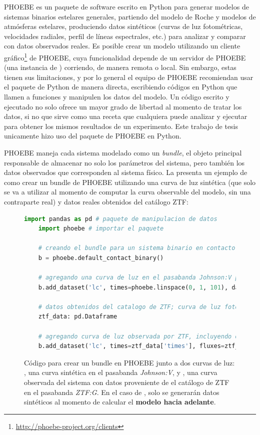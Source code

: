 PHOEBE es un paquete de software escrito en Python para generar modelos de
sistemas binarios estelares generales, partiendo del modelo de Roche y modelos
de atmósferas estelares, produciendo datos sintéticos (curvas de luz
fotométricas, velocidades radiales, perfil de líneas espectrales, etc.) para
analizar y comparar con datos observados reales. Es posible crear un modelo
utilizando un cliente
gráfico\footnote{\protect\url{http://phoebe-project.org/clients}} de PHOEBE,
cuya funcionalidad depende de un servidor de PHOEBE (una instancia de
) corriendo, de manera remota o local. Sin embargo, estas
tienen sus limitaciones, y por lo general el equipo de PHOEBE recomiendan usar
el paquete de Python de manera directa, escribiendo códigos en Python que llamen
a funciones y manipulen los datos del modelo. Un código escrito y ejecutado no
solo ofrece un mayor grado de libertad al momento de tratar los datos, si no que
sirve como una receta que cualquiera puede analizar y ejecutar para obtener los
mismos resultados de un experimento. Este trabajo de tesis unicamente hizo uso
del paquete de PHOEBE en Python.

PHOEBE maneja cada sistema modelado como un \textit{bundle}, el objeto principal
responsable de almacenar no solo los parámetros del sistema, pero también los
datos observados que corresponden al sistema físico. La
 presenta un ejemplo de como crear un
bundle de PHOEBE utilizando una curva de luz sintética (que solo se va a
utilizar al momento de computar la curva observable del modelo, sin una
contraparte real) y datos reales obtenidos del catálogo ZTF:

\begin{figure}[!ht]
	\begin{lstlisting}[language=Python, autogobble]
	import pandas as pd # paquete de manipulacion de datos
	import phoebe # importar el paquete

	# creando el bundle para un sistema binario en contacto
	b = phoebe.default_contact_binary() 

	# agregando una curva de luz en el pasabanda Johnson:V para computar (no datos reales)
	b.add_dataset('lc', times=phoebe.linspace(0, 1, 101), dataset='lc01', passband='Johnson:V')

	# datos obtenidos del catalogo de ZTF; curva de luz fotometrica, en el pasabanda ZTF:g
	ztf_data: pd.Dataframe

	# agregando curva de luz observada por ZTF, incluyendo el flujo medido y su incertidumbre
	b.add_dataset('lc', times=ztf_data['times'], fluxes=ztf_data['fluxes'], sigmas=ztf_data['flux_err'], passband='ZTF:g', dataset='lcZtfG')
	\end{lstlisting}
	\caption{Código para crear un bundle en PHOEBE junto a dos curvas de luz:
	, una curva sintética en el pasabanda \textit{Johnson:V}, y
	, una curva observada del sistema con datos proveniente de el
	catálogo de ZTF en el pasabanda \textit{ZTF:G}. En el caso de ,
	solo se generarán datos sintéticos al momento de calcular el \textbf{modelo
	hacia adelante}.}
	\label{codigoCreandoPhoebeBundle}
\end{figure}

